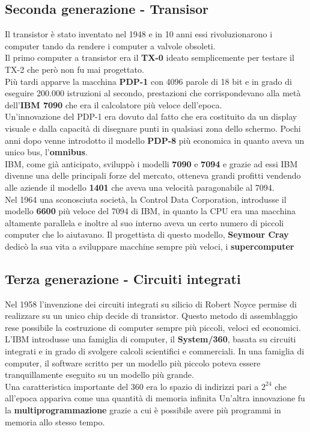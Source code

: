 \documentclass[12pt]{report}
\begin{document}
		\subsection{Seconda generazione - Transisor}
		Il transistor è stato inventato nel 1948 e in 10 anni essi rivoluzionarono i computer tando da rendere i computer a valvole obsoleti. \\
		Il primo computer a transistor era il \textbf{TX-0} ideato semplicemente per testare il TX-2 che però non fu mai progettato. \\
		Più tardi apparve la macchina \textbf{PDP-1} con 4096 parole di 18 bit e in grado di eseguire 200.000 istruzioni al secondo, prestazioni che corrispondevano alla metà dell'\textbf{IBM 7090} che era il calcolatore più veloce dell'epoca. \\
		Un'innovazione del PDP-1 era dovuto dal fatto che era costituito da un display visuale e dalla capacità di disegnare punti in qualsiasi zona dello schermo. Pochi anni dopo venne introdotto il modello \textbf{PDP-8} più economica in quanto aveva un unico bus, l'\textbf{omnibus}. \\
		IBM, come già anticipato, sviluppò i modelli \textbf{7090} e \textbf{7094} e grazie ad essi IBM divenne una delle principali forze del mercato, otteneva grandi profitti vendendo alle aziende il modello \textbf{1401} che aveva una velocità paragonabile al 7094. \\
		Nel 1964 una sconosciuta società, la Control Data Corporation, introdusse il modello \textbf{6600} più veloce del 7094 di IBM, in quanto la CPU era una macchina altamente parallela e inoltre al suo interno aveva un certo numero di piccoli computer che lo aiutavano. Il progettista di questo modello, \textbf{Seymour Cray} dedicò la sua vita a sviluppare macchine sempre più veloci, i \textbf{supercomputer}
		\subsection{Terza generazione - Circuiti integrati}
		Nel 1958 l'invenzione dei circuiti integrati su silicio di Robert Noyce permise di realizzare su un unico chip decide di transistor. Questo metodo di assemblaggio rese possibile la costruzione di computer sempre più piccoli, veloci ed economici. \\
		L'IBM introdusse una famiglia di computer, il \textbf{System/360}, basata su circuiti integrati e in grado di svolgere calcoli scientifici e commerciali. In una famiglia di computer, il software scritto per un modello più piccolo poteva essere tranquillamente eseguito su un modello più grande. \\
		Una caratteristica importante del 360 era lo spazio di indirizzi pari a $2^24$ che all'epoca appariva come una quantità di memoria infinita
		Un'altra innovazione fu la \textbf{multiprogrammazione} grazie a cui è possibile avere più programmi in memoria allo stesso tempo.
\end{document}

